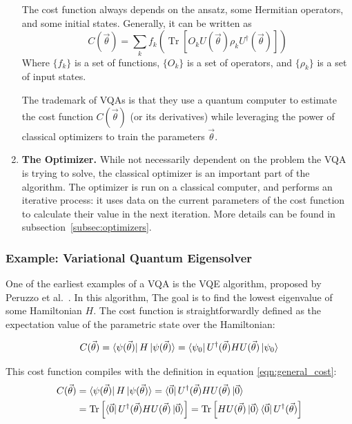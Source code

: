 \documentclass[a4paper,12pt]{article}
\newcommand{\thetas}{\vec{\theta}}
\DeclareMathOperator{\tr}{Tr}
\begin{document}
\begin{enumerate}
    The cost function always depends on the ansatz, some Hermitian operators, and some initial states.
    Generally, it can be written as
    \begin{equation} \label{eqn:general_cost}
        C(\thetas) = \sum_k f_k(\tr[O_k U(\thetas) \rho_k U^\dagger(\thetas)])
    \end{equation} 
    Where $\{f_k\}$ is a set of functions, $\{O_k\}$ is a set of operators, and $\{\rho_k\}$ is a set of input states.
    
    The trademark of VQAs is that they use a quantum computer to estimate the cost function $C(\thetas)$ (or its derivatives) while leveraging the power of classical optimizers to train the parameters $\thetas$.
    
    \item \textbf{The Optimizer.} While not necessarily dependent on the problem the VQA is trying to solve, the classical optimizer is an important part of the algorithm.
    The optimizer is run on a classical computer, and performs an iterative process: it uses data on the current parameters of the cost function to calculate their value in the next iteration. More details can be found in subsection~\ref{subsec:optimizers}.
\end{enumerate}


\subsubsection{Example: Variational Quantum Eigensolver} \label{subsec:vqe}
One of the earliest examples of a VQA is the VQE algorithm, proposed by Peruzzo et al.~\cite{peruzzo_variational_2014}. In this algorithm, The goal is to find the lowest eigenvalue of some Hamiltonian $H$.
The cost function is straightforwardly defined as the expectation value of the parametric state over the Hamiltonian:

\begin{equation} \label{eqn:vqe_cost}
    C(\thetas) = \bra{\psi(\thetas)} H \ket{\psi(\thetas)} = \bra{\psi_0} U^\dagger(\thetas) H U(\thetas) \ket{\psi_0}
\end{equation}

This cost function compiles with the definition in equation \ref{eqn:general_cost}:
\begin{align*}
    C(\thetas) &= \bra{\psi(\thetas)} H \ket{\psi(\thetas)} = \bra{\vec{0}} U^\dagger(\thetas) H U(\thetas) \ket{\vec{0}} \\
    &= \tr \left[ \bra{\vec{0}} U^\dagger(\thetas) H U(\thetas) \ket{\vec{0}} \right] = \tr \left[ H U(\thetas) \ket{\vec{0}}  \bra{\vec{0}} U^\dagger(\thetas)\right]
\end{align*}
\end{document}
